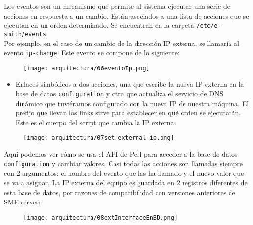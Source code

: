 Los eventos son un mecanismo que permite al sistema ejecutar una serie de acciones en respuesta a un cambio. Están asociados a una lista de acciones que se ejecutan en un orden determinado. Se encuentran en la carpeta \lstinline!/etc/e-smith/events!\\

Por ejemplo, en el caso de un cambio de la dirección IP externa, se llamaría al evento \lstinline!ip-change!. Este evento se compone de lo siguiente:

\begin{figure}[H]
    \centering
    \texttt{[image: arquitectura/06eventoIp.png]}
\end{figure}

\begin{itemize}
\item Enlaces simbólicos a dos acciones, una que escribe la nueva IP externa en la base de datos \lstinline!configuration! y otra que actualiza el servicio de DNS dinámico que tuviéramos configurado con la nueva IP de nuestra máquina. El prefijo que llevan los links sirve para establecer en qué orden se ejecutarán. Este es el cuerpo del script que cambia la IP externa:
\end{itemize}

\begin{figure}[H]
    \centering
    \texttt{[image: arquitectura/07set-external-ip.png]}
\end{figure}

Aquí podemos ver cómo se usa el API de Perl para acceder a la base de datos \lstinline!configuration! y cambiar valores. Casi todas las acciones son llamadas siempre con 2 argumentos: el nombre del evento que las ha llamado y el nuevo valor que se va a asignar. La IP externa del equipo es guardada en 2 registros diferentes de esta base de datos, por razones de compatibilidad con versiones anteriores de SME server:

\begin{figure}[H]
    \centering
    \texttt{[image: arquitectura/08extInterfaceEnBD.png]}
\end{figure}


